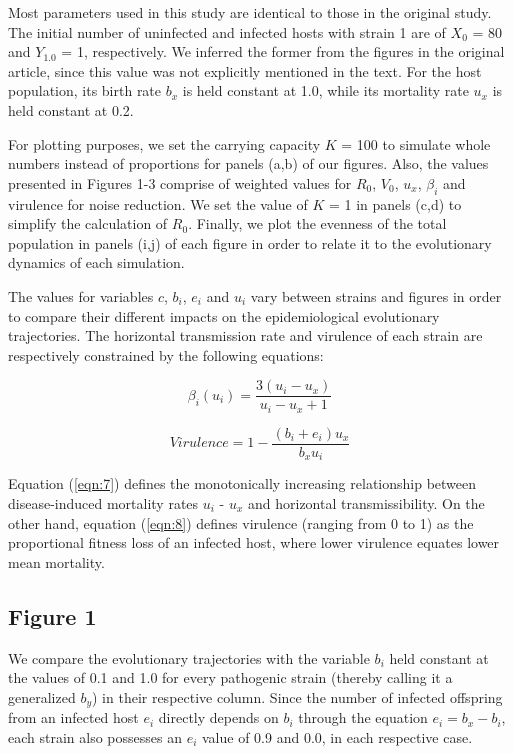 Most parameters used in this study are identical to those in the original study.
The initial number of uninfected and infected hosts with strain 1 are of
$X_0$ = 80 and $Y_{1.0}$ = 1, respectively. We inferred the former
from the figures in the original article, since this value was not explicitly
mentioned in the text. For the host population, its birth rate $b_x$ is held
constant at 1.0, while its mortality rate $u_x$ is held constant at 0.2.

For plotting purposes, we set the carrying capacity $K$ = 100 to simulate whole
numbers instead of proportions for panels (a,b) of our figures. Also, the values
presented in Figures 1-3 comprise of weighted values for $R_0$, $V_0$, $u_x$,
$\beta_i$ and virulence for noise reduction. We set the value of $K$ = 1 in
panels (c,d) to simplify the calculation of $R_0$. Finally, we plot the evenness
of the total population in panels (i,j) of each figure in order to relate it to
the evolutionary dynamics of each simulation.

The values for variables $c$, $b_i$, $e_i$ and $u_i$ vary between strains and
figures in order to compare their different impacts on the epidemiological
evolutionary trajectories. The horizontal transmission rate and virulence of
each strain are respectively constrained by the following equations:

\begin{equation}
\beta_i(u_i) = \frac{3(u_i - u_x)}{u_i - u_x + 1}
\label{eqn:7}
\end{equation}

\begin{equation}
Virulence = 1 - \frac{(b_i + e_i)u_x}{b_x u_i}
\label{eqn:8}
\end{equation}

Equation (\ref{eqn:7}) defines the monotonically increasing relationship
between disease-induced mortality rates $u_i$ - $u_x$ and horizontal
transmissibility. On the other hand, equation (\ref{eqn:8}) defines virulence
(ranging from 0 to 1) as the proportional fitness loss of an infected host,
where lower virulence equates lower mean mortality.

\subsection{Figure 1}

We compare the evolutionary trajectories with the variable $b_i$ held constant
at the values of 0.1 and 1.0 for every pathogenic strain (thereby calling it a
generalized $b_y$) in their respective column. Since the number of infected
offspring from an infected host $e_i$ directly depends on $b_i$ through the
equation $e_i = b_x - b_i$, each strain also possesses an $e_i$ value of 0.9
and 0.0, in each respective case.

